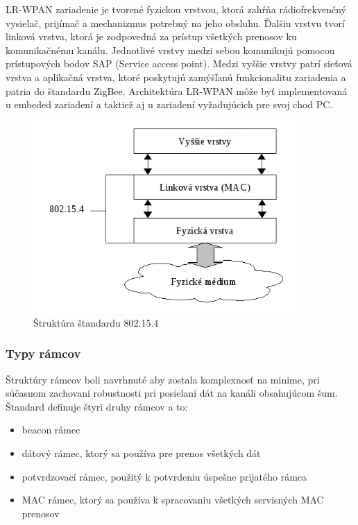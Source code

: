 \documentclass[11pt,twoside,a4paper]{book}
\begin{document}
LR-WPAN zariadenie je tvorené fyzickou vrstvou, ktorá zahŕňa rádiofrekvenčný vysielač, prijímač a mechanizmus potrebný na jeho obsluhu. Ďalšiu vrstvu tvorí linková vrstva, ktorá je zodpovedná za prístup všetkých prenosov ku komunikačnému kanálu. Jednotlivé vrstvy medzi sebou komunikujú pomocou prístupových bodov SAP (Service access point). Medzi vyššie vrstvy patrí sieťová vrstva a aplikačná vrstva, ktoré poskytujú zamýšľanú funkcionalitu zariadenia a patria do štandardu ZigBee. Architektúra LR-WPAN môže byť implementovaná u embeded zariadení a taktiež aj u zariadení vyžadujúcich pre svoj chod PC.



\begin{figure}[h]
 \centering
 \includegraphics[width=10cm]{./figures/layers802154.png}
 \caption{Štruktúra štandardu 802.15.4}
 \label{fig:802154layers}
\end{figure}

\subsubsection{Typy rámcov}
Štruktúry rámcov boli navrhnuté aby zostala komplexnosť na minime, pri súčasnom zachovaní robustnosti pri posielaní dát na kanáli obsahujúcom šum.
Štandard definuje štyri druhy rámcov a to:
\begin{itemize}
\item beacon rámec
\item dátový rámec, ktorý sa používa pre prenos všetkých dát
\item potvrdzovací rámec, použitý k potvrdeniu úspešne prijatého rámca
\item MAC rámec, ktorý sa používa k spracovaniu všetkých servisných MAC prenosov
\end{itemize}
\end{document}
